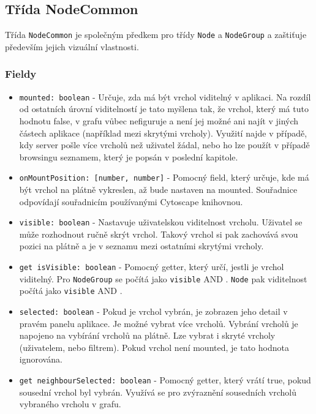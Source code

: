 \subsection{Třída NodeCommon}
Třída \texttt{NodeCommon} je společným předkem pro třídy \texttt{Node} a \texttt{NodeGroup} a zaštiťuje především jejich vizuální vlastnosti.

\subsubsection*{Fieldy}
\begin{itemize}
  \item \texttt{mounted: boolean} - Určuje, zda má být vrchol viditelný v aplikaci. Na rozdíl od ostatních úrovní viditelností je tato myšlena tak, že vrchol, který má tuto hodnotu false, v grafu vůbec nefiguruje a není jej možné ani najít v jiných částech aplikace (například mezi skrytými vrcholy). Využití najde v případě, kdy server pošle více vrcholů než uživatel žádal, nebo ho lze použít v případě browsingu seznamem, který je popsán v poslední kapitole.

  \item \texttt{onMountPosition: [number, number]} - Pomocný field, který určuje, kde má být vrchol na plátně vykreslen, až bude nastaven na mounted. Souřadnice odpovídají souřadnicím používanými Cytoscape knihovnou.

  \item \texttt{visible: boolean} - Nastavuje uživatelskou viditelnost vrcholu. Uživatel se může rozhodnout ručně skrýt vrchol. Takový vrchol si pak zachovává svou pozici na plátně a je v seznamu mezi ostatními skrytými vrcholy.

  \item \texttt{get isVisible: boolean} - Pomocný getter, který určí, jestli je vrchol viditelný. Pro \texttt{NodeGroup} se počítá jako \texttt{visible} AND .  \texttt{Node} pak viditelnost počítá jako \texttt{visible} AND .

  \item \texttt{selected: boolean} - Pokud je vrchol vybrán, je zobrazen jeho detail v pravém panelu aplikace. Je možné vybrat více vrcholů. Vybrání vrcholů je napojeno na vybírání vrcholů na plátně. Lze vybrat i skryté vrcholy (uživatelem, nebo filtrem). Pokud vrchol není mounted, je tato hodnota ignorována.

  \item \texttt{get neighbourSelected: boolean} - Pomocný getter, který vrátí true, pokud sousední vrchol byl vybrán. Využívá se pro zvýraznění sousedních vrcholů vybraného vrcholu v grafu.


\end{itemize}
